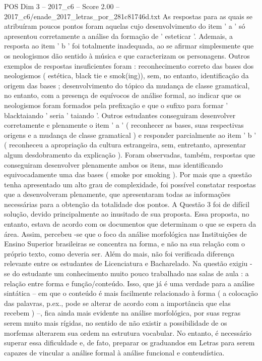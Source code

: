 \begin{textsample}{POS Dim 3 – 2017\_c6 – Score 2.00 – 2017\_c6/enade\_2017\_letras\_por\_281c81746d.txt}
As respostas para as quais se atribuíram poucos pontos foram aquelas cujo desenvolvimento do item ' a ' só apresentou corretamente a análise da formação de ' esteticar '.
Ademais, a resposta ao item ' b ' foi totalmente inadequada, ao se afirmar simplesmente que os neologismos dão sentido à música e que caracterizam os personagens.
Outros exemplos de respostas insuficientes foram : reconhecimento correto das bases dos neologismos ( estética, black tie e smok(ing)), sem, no entanto, identificação da origem das bases ; desenvolvimento do tópico da mudança de classe gramatical, no entanto, com a presença de equívocos de análise formal, ao indicar que os neologismos foram formados pela prefixação e que o sufixo para formar ' blacktaiando ' seria ' taiando '.
Outros estudantes conseguiram desenvolver corretamente e plenamente o item ' a ' ( reconhecer as bases, suas respectivas origens e a mudança de classe gramatical ) e responder parcialmente ao item ' b ' ( reconheceu a apropriação da cultura estrangeira, sem, entretanto, apresentar algum desdobramento da explicação ).
Foram observadas, também, respostas que conseguiram desenvolver plenamente ambos os itens, mas identificando equivocadamente uma das bases ( smoke por smoking ).
Por mais que a questão tenha apresentado um alto grau de complexidade, foi possível constatar respostas que a desenvolveram plenamente, que apresentaram todas as informações necessárias para a obtenção da totalidade dos pontos.
A Questão 3 foi de difícil solução, devido principalmente ao inusitado de sua proposta.
Essa proposta, no entanto, estava de acordo com os documentos que determinam o que se espera da área.
Assim, percebeu -se que o foco da análise morfológica nas Instituições de Ensino Superior brasileiras se concentra na forma, e não na sua relação com o próprio texto, como deveria ser.
Além do mais, não foi verificada diferença relevante entre os estudantes de Licenciatura e Bacharelado.
Na questão exigiu -se do estudante um conhecimento muito pouco trabalhado nas salas de aula : a relação entre forma e função/conteúdo.
Isso, que já é uma verdade para a análise sintática – em que o conteúdo é mais facilmente relacionado à forma ( a colocação das palavras, p.ex., pode se alterar de acordo com a importância que elas recebem ) –, fica ainda mais evidente na análise morfológica, por suas regras serem muito mais rígidas, no sentido de não existir a possibilidade de os morfemas alterarem sua ordem na estrutura vocabular.
No entanto, é necessário superar essa dificuldade e, de fato, preparar os graduandos em Letras para serem capazes de vincular a análise formal à análise funcional e conteudística.

\end{textsample}
